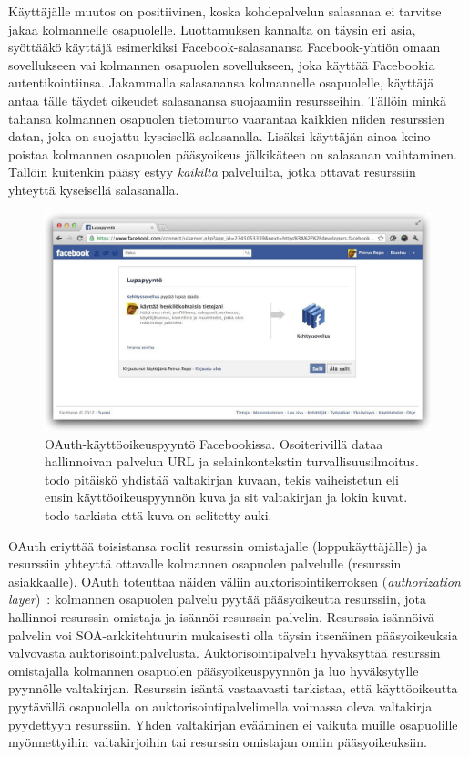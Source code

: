 \documentclass[finnish,gradu]{tktltiki}
\begin{document}
  Käyttäjälle muutos on positiivinen, koska kohdepalvelun salasanaa ei tarvitse jakaa kolmannelle osapuolelle. Luottamuksen kannalta on täysin eri asia, syöttääkö käyttäjä esimerkiksi Facebook-salasanansa Facebook-yhtiön omaan sovellukseen vai kolmannen osapuolen sovellukseen, joka käyttää Facebookia autentikointiinsa. Jakammalla salasanansa kolmannelle osapuolelle, käyttäjä antaa tälle täydet oikeudet salasanansa suojaamiin resursseihin. Tällöin minkä tahansa kolmannen osapuolen tietomurto vaarantaa kaikkien niiden resurssien datan, joka on suojattu kyseisellä salasanalla. Lisäksi käyttäjän ainoa keino poistaa kolmannen osapuolen pääsyoikeus jälkikäteen on salasanan vaihtaminen. Tällöin kuitenkin pääsy estyy \emph{kaikilta} palveluilta, jotka ottavat resurssiin yhteyttä kyseisellä salasanalla.

  \begin{figure}
    \centering
    \includegraphics[width=1.0\textwidth]{images/facebook_oauth_lupapyynto.jpg}
    \caption{OAuth-käyttöoikeuspyyntö Facebookissa. Osoiterivillä dataa hallinnoivan palvelun URL ja selainkontekstin turvallisuusilmoitus. todo pitäiskö yhdistää valtakirjan kuvaan, tekis vaiheistetun eli ensin käyttöoikeuspyynnön kuva ja sit valtakirjan ja lokin kuvat. todo tarkista että kuva on selitetty auki.}
    \label{fig:facebook_oauth_lupapyynto}
  \end{figure}

  OAuth eriyttää toisistansa roolit resurssin omistajalle (loppukäyttäjälle) ja resurssiin yhteyttä ottavalle kolmannen osapuolen palvelulle (resurssin asiakkaalle). OAuth toteuttaa näiden väliin auktorisointikerroksen (\emph{authorization layer})~\cite{ietf_oauth2}: kolmannen osapuolen palvelu pyytää pääsyoikeutta resurssiin, jota hallinnoi resurssin omistaja ja isännöi resurssin palvelin. Resurssia isännöivä palvelin voi SOA-arkkitehtuurin mukaisesti olla täysin itsenäinen pääsyoikeuksia valvovasta auktorisointipalvelusta. Auktorisointipalvelu hyväksyttää resurssin omistajalla kolmannen osapuolen pääsyoikeuspyynnön ja luo hyväksytylle pyynnölle valtakirjan. Resurssin isäntä vastaavasti tarkistaa, että käyttöoikeutta pyytävällä osapuolella on auktorisointipalvelimella voimassa oleva valtakirja pyydettyyn resurssiin. Yhden valtakirjan evääminen ei vaikuta muille osapuolille myönnettyihin valtakirjoihin tai resurssin omistajan omiin pääsyoikeuksiin.
\end{document}
